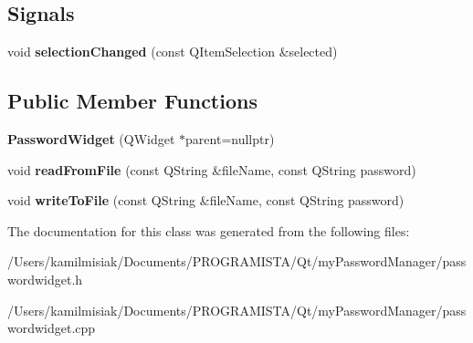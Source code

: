 \subsection*{Signals}
\begin{DoxyCompactItemize}
\item 
\mbox{\label{class_password_widget_a7924ba06cf2a2cbb6571d0e2fd9ff9c9}} 
void {\bfseries selection\+Changed} (const Q\+Item\+Selection \&selected)
\end{DoxyCompactItemize}
\subsection*{Public Member Functions}
\begin{DoxyCompactItemize}
\item 
\mbox{\label{class_password_widget_a2fac01f85c4f68fc396e720c90b8de43}} 
{\bfseries Password\+Widget} (Q\+Widget $\ast$parent=nullptr)
\item 
\mbox{\label{class_password_widget_a9a1fbc191c014624b4894a083f0c397d}} 
void {\bfseries read\+From\+File} (const Q\+String \&file\+Name, const Q\+String password)
\item 
\mbox{\label{class_password_widget_a1350ac02edcfec15bd369cdd2e18aef3}} 
void {\bfseries write\+To\+File} (const Q\+String \&file\+Name, const Q\+String password)
\end{DoxyCompactItemize}


The documentation for this class was generated from the following files\+:\begin{DoxyCompactItemize}
\item 
/\+Users/kamilmisiak/\+Documents/\+P\+R\+O\+G\+R\+A\+M\+I\+S\+T\+A/\+Qt/my\+Password\+Manager/passwordwidget.\+h\item 
/\+Users/kamilmisiak/\+Documents/\+P\+R\+O\+G\+R\+A\+M\+I\+S\+T\+A/\+Qt/my\+Password\+Manager/passwordwidget.\+cpp\end{DoxyCompactItemize}
